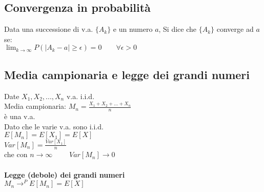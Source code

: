 \documentclass{article}
\begin{document}
\begin{multicols*}{3}
		\subsection{Convergenza in probabilità}
		Data una successione di v.a. \(\{A_k\}\) e un numero \(a\), Si dice che \(\{A_k\}\) converge ad \(a\) se:\\
		\(\lim_{k \rightarrow \infty} P(|A_k - a| \geq \epsilon ) = 0 \qquad \forall \epsilon > 0\)\\
		\subsection{Media campionaria e legge dei grandi numeri}
		Date \(X_1,X_2,...,X_n\) v.a. i.i.d.\\
		Media campionaria: \(M_n= \frac{X_1+X_2+...+X_n}{n} \)\\ è una v.a.\\
		Dato che le varie v.a. sono i.i.d.\\ \(E[M_n] =E[X_1]=E[X]\)\\
		\(Var[M_n] = \frac{Var[X_1]}{n} \)\\ che con \(n \rightarrow \infty \qquad\) \(Var[M_n] \rightarrow 0\)\\\\
		\textbf{Legge (debole) dei grandi numeri}\\
		\(M_n \longrightarrow^P E[M_n] = E[X]\)\\
		
		
		
		
		
		
		
		
		
		
		
		 
		
		
		
		
		
		
		
	\end{multicols*}
\end{document}
